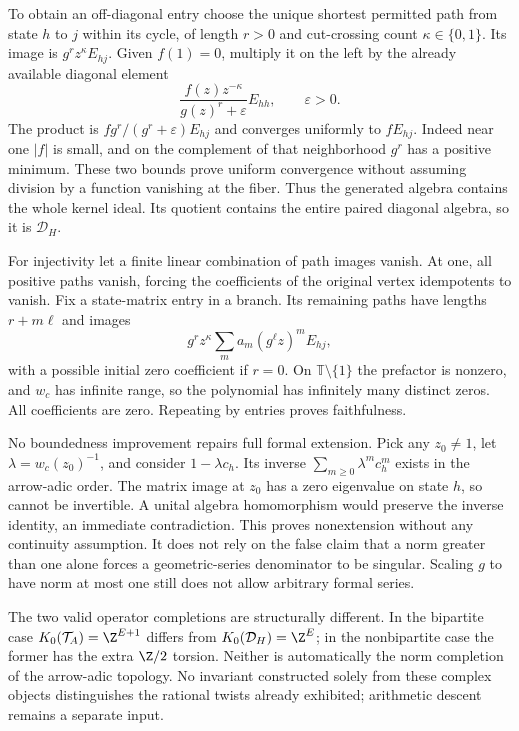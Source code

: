 \documentclass[11pt]{article}
\theoremstyle{definition}\newtheorem{definition}[theorem]{Definition}
\theoremstyle{remark}\newtheorem{remark}[theorem]{Remark}
\begin{document}
To obtain an off-diagonal entry choose the unique shortest permitted path from state $h$ to $j$ within its cycle, of length $r>0$ and cut-crossing count $\kappa\in\{0,1\}$. Its image is $g^rz^\kappa E_{hj}$. Given $f(1)=0$, multiply it on the left by the already available diagonal element
\[
 \frac{f(z)z^{-\kappa}}{g(z)^r+\varepsilon}E_{hh},\qquad \varepsilon>0.
\]
The product is $f g^r/(g^r+\varepsilon)E_{hj}$ and converges uniformly to $fE_{hj}$. Indeed near one $|f|$ is small, and on the complement of that neighborhood $g^r$ has a positive minimum. These two bounds prove uniform convergence without assuming division by a function vanishing at the fiber. Thus the generated algebra contains the whole kernel ideal. Its quotient contains the entire paired diagonal algebra, so it is $\mathcal D_H$.

For injectivity let a finite linear combination of path images vanish. At one, all positive paths vanish, forcing the coefficients of the original vertex idempotents to vanish. Fix a state-matrix entry in a branch. Its remaining paths have lengths $r+m\ell$ and images
\[
 g^rz^\kappa\sum_m a_m(g^\ell z)^m E_{hj},
\]
with a possible initial zero coefficient if $r=0$. On $\mathbb T\setminus\{1\}$ the prefactor is nonzero, and $w_c$ has infinite range, so the polynomial has infinitely many distinct zeros. All coefficients are zero. Repeating by entries proves faithfulness.

No boundedness improvement repairs full formal extension. Pick any $z_0\ne1$, let $\lambda=w_c(z_0)^{-1}$, and consider $1-\lambda c_h$. Its inverse $\sum_{m\ge0}\lambda^m c_h^m$ exists in the arrow-adic order. The matrix image at $z_0$ has a zero eigenvalue on state $h$, so cannot be invertible. A unital algebra homomorphism would preserve the inverse identity, an immediate contradiction. This proves nonextension without any continuity assumption. It does not rely on the false claim that a norm greater than one alone forces a geometric-series denominator to be singular. Scaling $g$ to have norm at most one still does not allow arbitrary formal series.

The two valid operator completions are structurally different. In the bipartite case $K_0(\mathcal T_A)=\Z^{E+1}$ differs from $K_0(\mathcal D_H)=\Z^E$; in the nonbipartite case the former has the extra $\Z/2$ torsion. Neither is automatically the norm completion of the arrow-adic topology. No invariant constructed solely from these complex objects distinguishes the rational twists already exhibited; arithmetic descent remains a separate input.
\end{document}
